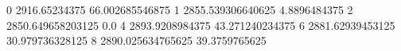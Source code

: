 0 2916.65234375 66.002685546875
1 2855.539306640625 4.8896484375
2 2850.649658203125 0.0
4 2893.9208984375 43.271240234375
6 2881.62939453125 30.979736328125
8 2890.025634765625 39.3759765625
